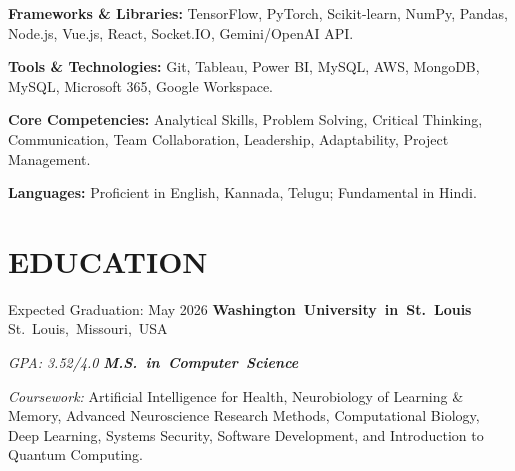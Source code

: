 \documentclass[10pt, letterpaper]{article}
\begin{document}
\vspace{\entrySpacing}
\begin{onecolentry}
    \textbf{Frameworks \& Libraries:} TensorFlow, PyTorch, Scikit-learn, NumPy, Pandas, Node.js, Vue.js, React, Socket.IO, Gemini/OpenAI API.
\end{onecolentry}

\vspace{\entrySpacing}
\begin{onecolentry}
    \textbf{Tools \& Technologies:} Git, Tableau, Power BI, MySQL, AWS, MongoDB, MySQL, Microsoft 365, Google Workspace.
\end{onecolentry}

\vspace{\entrySpacing}
\begin{onecolentry}
    \textbf{Core Competencies:} Analytical Skills, Problem Solving, Critical Thinking, Communication, Team Collaboration, Leadership, Adaptability, Project Management.
\end{onecolentry}

\vspace{\entrySpacing}
\begin{onecolentry}
    \textbf{Languages:} Proficient in English, Kannada, Telugu; Fundamental in Hindi.
\end{onecolentry}

\vspace{\headerSpacing}
\section{EDUCATION}

\vspace{\entrySpacing}
\begin{twocolentry}{Expected Graduation: May 2026}
    \mbox{\textbf{Washington University in St. Louis}
        \kern {}
        \AND
        \kern {}}
    \mbox{St. Louis, Missouri, USA}
\end{twocolentry}

\begin{twocolentry}{\textsl{GPA: 3.52/4.0}}
    \mbox{\textbf{\textsl{M.S. in Computer Science}}}
\end{twocolentry}

\begin{onecolentry}
    \begin{highlights}
        \textit{Coursework:} Artificial Intelligence for Health, Neurobiology of Learning \& Memory, Advanced Neuroscience Research Methods, Computational Biology, Deep Learning, Systems Security, Software Development, and Introduction to Quantum Computing.
    \end{highlights}
\end{onecolentry}
\end{document}
